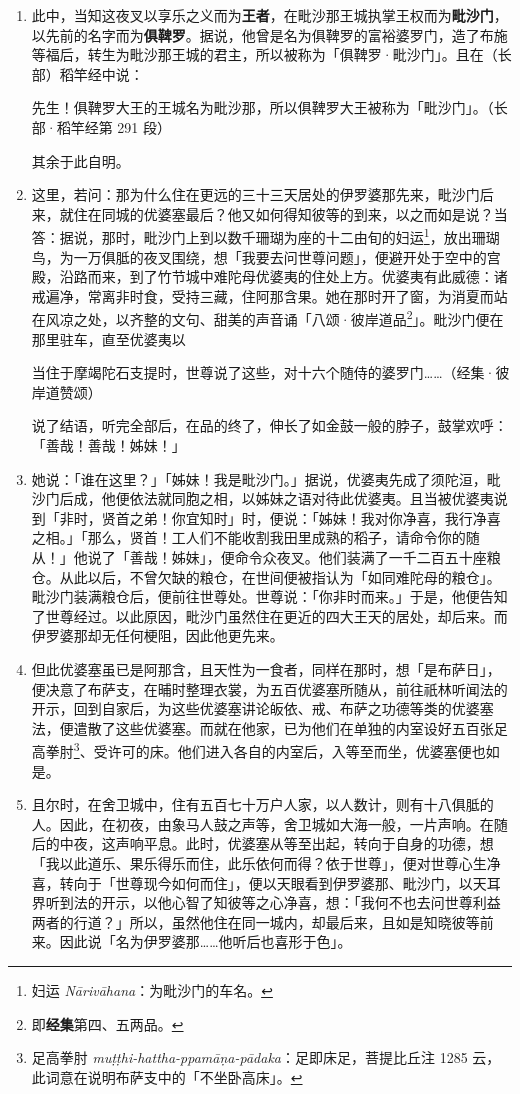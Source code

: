 \begin{enumerate}\item 此中，当知这夜叉以享乐之义而为\textbf{王者}，在毗沙那王城执掌王权而为\textbf{毗沙门}，以先前的名字而为\textbf{俱鞞罗}。据说，他曾是名为俱鞞罗的富裕婆罗门，造了布施等福后，转生为毗沙那王城的君主，所以被称为「俱鞞罗·毗沙门」。且在（长部）稻竿经中说：\begin{quoting}先生！俱鞞罗大王的王城名为毗沙那，所以俱鞞罗大王被称为「毗沙门」。（长部·稻竿经第 291 段）\end{quoting}其余于此自明。
\item 这里，若问：那为什么住在更远的三十三天居处的伊罗婆那先来，毗沙门后来，就住在同城的优婆塞最后？他又如何得知彼等的到来，以之而如是说？当答：据说，那时，毗沙门上到以数千珊瑚为座的十二由旬的妇运\footnote{妇运 \textit{Nārivāhana}：为毗沙门的车名。}，放出珊瑚鸟，为一万俱胝的夜叉围绕，想「我要去问世尊问题」，便避开处于空中的宫殿，沿路而来，到了竹节城中难陀母优婆夷的住处上方。优婆夷有此威德：诸戒遍净，常离非时食，受持三藏，住阿那含果。她在那时开了窗，为消夏而站在风凉之处，以齐整的文句、甜美的声音诵「八颂·彼岸道品\footnote{即\textbf{经集}第四、五两品。}」。毗沙门便在那里驻车，直至优婆夷以\begin{quoting}当住于摩竭陀石支提时，世尊说了这些，对十六个随侍的婆罗门……（经集·彼岸道赞颂）\end{quoting}说了结语，听完全部后，在品的终了，伸长了如金鼓一般的脖子，鼓掌欢呼：「善哉！善哉！姊妹！」
\item 她说：「谁在这里？」「姊妹！我是毗沙门。」据说，优婆夷先成了须陀洹，毗沙门后成，他便依法就同胞之相，以姊妹之语对待此优婆夷。且当被优婆夷说到「非时，贤首之弟！你宜知时」时，便说：「姊妹！我对你净喜，我行净喜之相。」「那么，贤首！工人们不能收割我田里成熟的稻子，请命令你的随从！」他说了「善哉！姊妹」，便命令众夜叉。他们装满了一千二百五十座粮仓。从此以后，不曾欠缺的粮仓，在世间便被指认为「如同难陀母的粮仓」。毗沙门装满粮仓后，便前往世尊处。世尊说：「你非时而来。」于是，他便告知了世尊经过。以此原因，毗沙门虽然住在更近的四大王天的居处，却后来。而伊罗婆那却无任何梗阻，因此他更先来。
\item 但此优婆塞虽已是阿那含，且天性为一食者，同样在那时，想「是布萨日」，便决意了布萨支，在晡时整理衣裳，为五百优婆塞所随从，前往祇林听闻法的开示，回到自家后，为这些优婆塞讲论皈依、戒、布萨之功德等类的优婆塞法，便遣散了这些优婆塞。而就在他家，已为他们在单独的内室设好五百张足高拳肘\footnote{足高拳肘 \textit{muṭṭhi-hattha-ppamāṇa-pādaka}：足即床足，菩提比丘注 1285 云，此词意在说明布萨支中的「不坐卧高床」。}、受许可的床。他们进入各自的内室后，入等至而坐，优婆塞便也如是。
\item 且尔时，在舍卫城中，住有五百七十万户人家，以人数计，则有十八俱胝的人。因此，在初夜，由象马人鼓之声等，舍卫城如大海一般，一片声响。在随后的中夜，这声响平息。此时，优婆塞从等至出起，转向于自身的功德，想「我以此道乐、果乐得乐而住，此乐依何而得？依于世尊」，便对世尊心生净喜，转向于「世尊现今如何而住」，便以天眼看到伊罗婆那、毗沙门，以天耳界听到法的开示，以他心智了知彼等之心净喜，想：「我何不也去问世尊利益两者的行道？」所以，虽然他住在同一城内，却最后来，且如是知晓彼等前来。因此说「名为伊罗婆那……他听后也喜形于色」。\end{enumerate}

